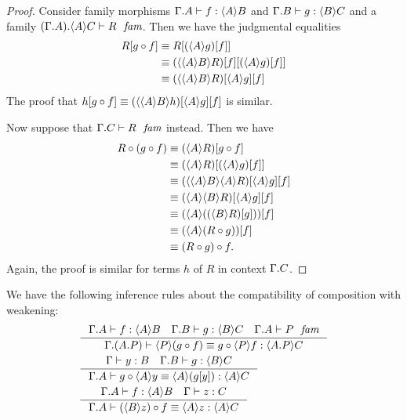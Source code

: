 \begin{proof}
Consider family morphisms $\jhom{\Gamma}{A}{B}{f}$ and $\jhom{\Gamma}{B}{C}{g}$
and a family $\jfam{{{\Gamma}{A}}{\ctxwk{A}{C}}}{R}$. Then we have the judgmental
equalities
\begin{align*}
\subst{\jcomp{f}{g}}{R} & \jdeq \subst{{f}{\ctxwk{A}{g}}}{R}\\
& \jdeq \subst{{f}{\ctxwk{A}{g}}}{\subst{f}{\ctxwk{{A}{B}}{R}}}\\
& \jdeq \subst{f}{{\ctxwk{A}{g}}{\ctxwk{{A}{B}}{R}}}
\end{align*}
The proof that 
$\subst{\jcomp{f}{g}}{h}\jdeq\subst{f}{{\ctxwk{A}{g}}{\ctxwk{{A}{B}}{h}}}$
is similar.

Now suppose that $\jfam{{\Gamma}{C}}{R}$ instead. Then we have
\begin{align*}
\jcomp{{f}{g}}{R} & \jdeq \subst{\jcomp{f}{g}}{\ctxwk{A}{R}}\\
& \jdeq \subst{{f}{\ctxwk{A}{g}}}{\ctxwk{A}{R}}\\
& \jdeq \subst{f}{{\ctxwk{A}{g}}{\ctxwk{{A}{B}}{{A}{R}}}}\\
& \jdeq \subst{f}{{\ctxwk{A}{g}}{\ctxwk{A}{{B}{R}}}}\\
& \jdeq \subst{f}{\ctxwk{A}{\subst{g}{\ctxwk{B}{R}}}}\\
& \jdeq \subst{f}{\ctxwk{A}{\jcomp{g}{R}}}\\
& \jdeq \jcomp{f}{{g}{R}}.
\end{align*}
Again, the proof is similar for terms $h$ of $R$ in context $\ctxext{\Gamma}{C}$.
\end{proof}

\begin{lem}
We have the following inference rules about the compatibility of composition with
weakening:
\begin{align*}
& \inference
  {\jhom{\Gamma}{A}{B}{f}
   \jhom{\Gamma}{B}{C}{g}
   \jfam{{\Gamma}{A}}{P}}
  {\jhomeq{\Gamma}{{A}{P}}{C}
    {\ctxwk{P}{\jcomp{f}{g}}}
    {\jcomp{\ctxwk{P}{f}}{g}}}\\
& \inference
  {\jterm{\Gamma}{B}{y}
   \jhom{\Gamma}{B}{C}{g}}
  {\jhomeq{\Gamma}{A}{C}
    {\jcomp{\ctxwk{A}{y}}{g}}
    {\ctxwk{A}{\subst{y}{g}}}}\\
& \inference
  {\jhom{\Gamma}{A}{B}{f}
   \jterm{\Gamma}{C}{z}}
  {\jhomeq{\Gamma}{A}{C}
    {\jcomp{f}{\ctxwk{B}{z}}}
    {\ctxwk{A}{z}}}
\end{align*}
\end{lem}

